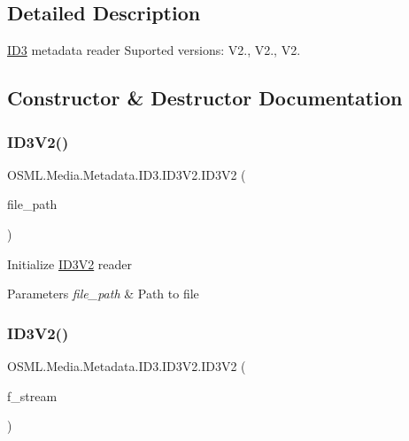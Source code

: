 \subsection{Detailed Description}
\mbox{\hyperlink{namespaceOSML_1_1Media_1_1Metadata_1_1ID3}{I\+D3}} metadata reader Suported versions\+: V2., V2., V2. 



\subsection{Constructor \& Destructor Documentation}
\mbox{\label{classOSML_1_1Media_1_1Metadata_1_1ID3_1_1ID3V2_afb6c13b0cf95b443ab31d61296b0476a}} 
\subsubsection{\texorpdfstring{ID3V2()}{ID3V2()}\hspace{0.1cm}{\footnotesize\ttfamily [1/2]}}
{\footnotesize\ttfamily O\+S\+M\+L.\+Media.\+Metadata.\+I\+D3.\+I\+D3\+V2.\+I\+D3\+V2 (\begin{DoxyParamCaption}\item[{string}]{file\+\_\+path }\end{DoxyParamCaption})\hspace{0.3cm}{\ttfamily [inline]}}



Initialize \mbox{\hyperlink{classOSML_1_1Media_1_1Metadata_1_1ID3_1_1ID3V2}{I\+D3\+V2}} reader 


\begin{DoxyParams}{Parameters}
{\em file\+\_\+path} & Path to file\\
\hline
\end{DoxyParams}
\mbox{\label{classOSML_1_1Media_1_1Metadata_1_1ID3_1_1ID3V2_a87d53935968908a75c9e7afb5237e162}} 
\subsubsection{\texorpdfstring{ID3V2()}{ID3V2()}\hspace{0.1cm}{\footnotesize\ttfamily [2/2]}}
{\footnotesize\ttfamily O\+S\+M\+L.\+Media.\+Metadata.\+I\+D3.\+I\+D3\+V2.\+I\+D3\+V2 (\begin{DoxyParamCaption}\item[{File\+Stream}]{f\+\_\+stream }\end{DoxyParamCaption})\hspace{0.3cm}{\ttfamily [inline]}}



